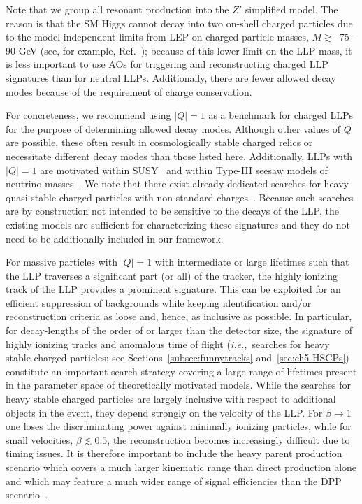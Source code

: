 Note that we group all resonant production into the $Z'$ simplified model.
The reason is that the SM Higgs cannot decay into two on-shell charged particles due to the model-independent limits from LEP on charged particle masses, $M\gtrsim$~75$-$90 GeV (see, for example, Ref.~\cite{Abbiendi:2003yd}); because of this lower limit on the LLP mass, it is less important to use AOs for triggering and reconstructing charged LLP signatures than for neutral LLPs.
Additionally, there are fewer allowed decay modes because of the requirement of charge conservation. 

For concreteness, we recommend using $|Q|=1$ as a benchmark for charged LLPs for the purpose of determining allowed decay modes.
Although other values of $Q$ are possible, these often result in cosmologically stable charged relics or necessitate different decay modes than those listed here.
Additionally, LLPs with $|Q|=1$ are motivated within SUSY~\cite{Chen:1995yu,Thomas:1998wy,Feng:1999fu,Jittoh:2005pq,Brandenburg:2005he,Heisig:2013rya} and within Type-III seesaw models of neutrino masses~\cite{Bajc:2006ia,Bajc:2007zf,Franceschini:2008pz,Arhrib:2009mz}.
We note that there exist already dedicated searches for heavy quasi-stable charged particles with non-standard charges~\cite{Aad:2015kta,Khachatryan:2016sfv}.
Because such searches are by construction not intended to be sensitive to the decays of the LLP, the existing models are sufficient for characterizing these signatures and they do not need to be additionally included in our framework.

For massive particles with $|Q|=1$ with intermediate or large lifetimes such that the LLP traverses a significant part (or all) of the tracker, the highly ionizing track of the LLP provides a prominent signature.
This can be exploited for an efficient suppression of backgrounds while keeping identification and/or reconstruction criteria as loose and, hence, as inclusive as possible.
In particular, for decay-lengths of the order of or larger than the detector size, the signature of highly ionizing tracks and anomalous time of flight (\emph{i.e.,}~searches for heavy stable charged particles; see Sections~\ref{subsec:funnytracks} and~\ref{sec:ch5-HSCPs}) constitute an important search strategy covering a large range of lifetimes present in the parameter space of theoretically motivated models.
While the searches for heavy stable charged particles are largely inclusive with respect to additional objects in the event, they depend strongly on the velocity of the LLP\@.
For $\beta\to1$ one loses the discriminating power against minimally ionizing particles, while for small velocities, $\beta\lesssim0.5$, the reconstruction becomes increasingly difficult due to timing issues.
It is therefore important to include the heavy parent production scenario which covers a much larger kinematic range than direct production alone and which may feature a much wider range of signal efficiencies than the DPP scenario~\cite{Heisig:2015yla}.

